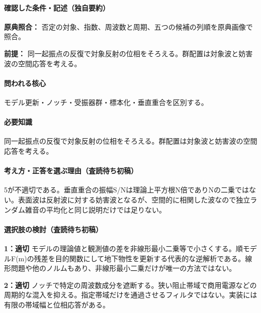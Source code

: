 \paragraph{確認した条件・記述（独自要約）}\mbox{}\par

\noindent\textbf{原典照合：} 否定の対象、指数、周波数と周期、五つの候補の列順を原典画像で照合。\par

\noindent\textbf{前提：} 同一起振点の反復で対象反射の位相をそろえる。群配置は対象波と妨害波の空間応答を考える。\par

\paragraph{問われる核心} モデル更新・ノッチ・受振器群・標本化・垂直重合を区別する。

\paragraph{必要知識} 同一起振点の反復で対象反射の位相をそろえる。群配置は対象波と妨害波の空間応答を考える。

\paragraph{考え方・正答を選ぶ理由（査読待ち初稿）} 5が不適切である。垂直重合の振幅S/Nは理論上平方根N倍でありNの二乗ではない。表面波は反射波に対する妨害波となるが、空間的に相関した波なので独立ランダム雑音の平均化と同じ説明だけでは足りない。

\paragraph{選択肢の検討（査読待ち初稿）}\mbox{}\par

\noindent\textbf{1：適切} モデルの理論値と観測値の差を非線形最小二乗等で小さくする。順モデルF(m)の残差を目的関数にして地下物性を更新する代表的な逆解析である。線形問題や他のノルムもあり、非線形最小二乗だけが唯一の方法ではない。\par

\noindent\textbf{2：適切} ノッチで特定の周波数成分を遮断する。狭い阻止帯域で商用電源などの周期的な混入を抑える。指定帯域だけを通過させるフィルタではない。実装には有限の帯域幅と位相応答がある。\par

